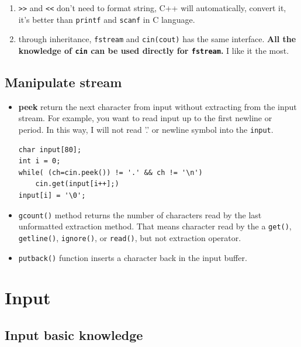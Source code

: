 \documentclass[a4paper,11pt,twoside]{book}
\begin{document}
\begin{itemize}
\begin{enumerate}
		\item \verb=>>= and \verb=<<= don't need to format string,  C++ will automatically,  convert it, it's better than \texttt{printf} and \texttt{scanf} in C language.
		
		\item through inheritance, \texttt{fstream} and \texttt{cin(cout)} has the same interface. \textbf{All the knowledge of \texttt{cin} can be used directly for \texttt{fstream}.} I like it the most.
	\end{enumerate}
	
\end{itemize}

\subsection{Manipulate stream}

\begin{itemize}
	\item \textbf{peek} return the next character from input without extracting from the input stream. For example, you want to read input up to the first newline or period. In this way, I will not read '.' or newline symbol into the \texttt{input}.
\begin{lstlisting}[numbers=none]
char input[80];
int i = 0;
while( (ch=cin.peek()) != '.' && ch != '\n')
	cin.get(input[i++];)
input[i] = '\0';
\end{lstlisting}
	
	\item \texttt{gcount()} method returns the number of characters read by the last unformatted extraction method. That means character read by the a \texttt{get()}, \texttt{getline()}, \texttt{ignore()}, or \texttt{read()}, but not extraction operator.
	
	\item \texttt{putback()} function inserts a character back in the input buffer.
\end{itemize}



\section{Input}

\subsection{Input basic knowledge}
\end{document}
